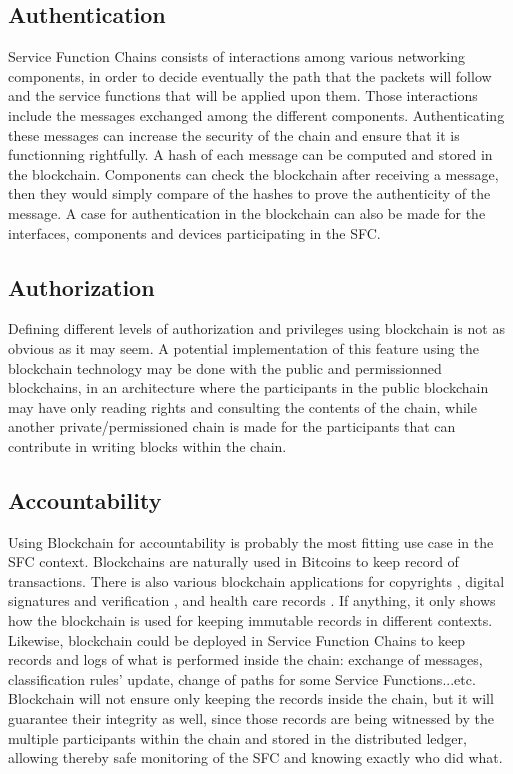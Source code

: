 \subsection{Authentication}
Service Function Chains consists of interactions among various networking components, in order to decide eventually the path that the packets will follow and the service functions that will be applied upon them. Those interactions include the messages exchanged among the different components. Authenticating these messages can increase the security of the chain and ensure that it is functionning rightfully. A hash of each message can be computed and stored in the blockchain. Components can check the blockchain after receiving a message, then they would simply compare of the hashes to prove the authenticity of the message. A case for authentication in the blockchain can also be made for the interfaces, components and devices participating in the SFC.
\subsection{Authorization}
Defining different levels of authorization and privileges using blockchain is not as obvious as it may seem. A potential implementation of this feature using the blockchain technology may be done with the public and permissionned blockchains, in an architecture where the participants in the public blockchain may have only reading rights and consulting the contents of the chain, while another private/permissioned chain is made for the participants that can contribute in writing blocks within the chain.
\subsection{Accountability}
Using Blockchain for accountability is probably the most fitting use case in the SFC context. Blockchains are naturally used in Bitcoins to keep record of transactions. There is also various blockchain applications for copyrights \cite{copyrights}, digital signatures and verification \cite{blocksign}, and health care records \cite{health}. If anything, it only shows how the blockchain is used for keeping immutable records in different contexts. Likewise, blockchain could be deployed in Service Function Chains to keep records and logs of what is performed inside the chain: exchange of messages, classification rules' update, change of paths for some Service Functions...etc. Blockchain will not ensure only keeping the records inside the chain, but it will guarantee their integrity as well, since those records are being witnessed by the multiple participants within the chain and stored in the distributed ledger, allowing thereby safe monitoring of the SFC and knowing exactly who did what.
